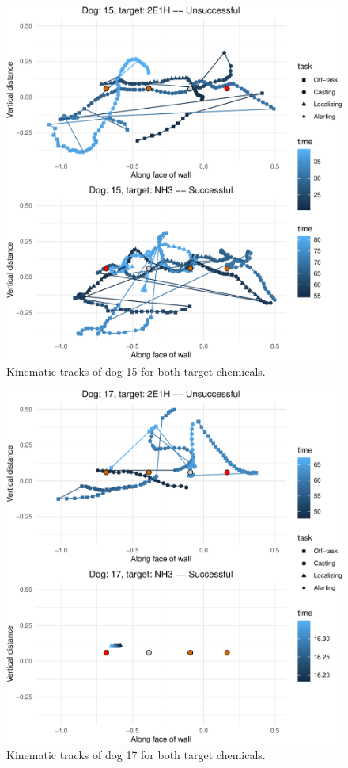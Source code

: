 \documentclass[
]{article}
\begin{document}
\begin{figure}
\centering
\includegraphics{supplementary-info_files/figure-latex/dog-15-1.pdf}
\caption{\label{fig:dog-15}Kinematic tracks of dog 15 for both target chemicals.}
\end{figure}

\begin{figure}
\centering
\includegraphics{supplementary-info_files/figure-latex/dog-17-1.pdf}
\caption{\label{fig:dog-17}Kinematic tracks of dog 17 for both target chemicals.}
\end{figure}
\end{document}
